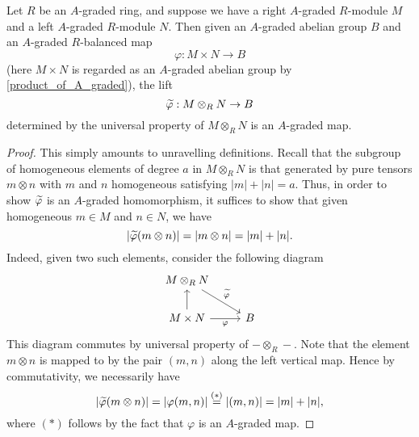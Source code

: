 \documentclass[../main.tex]{subfiles}
\begin{document}
\begin{lemma}\label{tensor_lift_of_A_graded_is_A_graded}
	Let $R$ be an $A$-graded ring, and suppose we have a right $A$-graded $R$-module $M$ and a left $A$-graded $R$-module $N$. Then given an $A$-graded abelian group $B$ and an $A$-graded $R$-balanced map
	\[\varphi:M\times N\to B\]
	(here $M\times N$ is regarded as an $A$-graded abelian group by \autoref{product_of_A_graded}), the lift
	\[\widetilde\varphi:M\otimes_RN\to B\]
	determined by the universal property of $M\otimes_RN$ is an $A$-graded map.
\end{lemma}
\begin{proof}
	This simply amounts to unravelling definitions. Recall that the subgroup of homogeneous elements of degree $a$ in $M\otimes_RN$ is that generated by pure tensors $m\otimes n$ with $m$ and $n$ homogeneous satisfying $|m|+|n|=a$. Thus, in order to show $\widetilde\varphi$ is an $A$-graded homomorphism, it suffices to show that given homogeneous $m\in M$ and $n\in N$, we have
	\[|\widetilde\varphi(m\otimes n)|=|m\otimes n|=|m|+|n|.\]
	Indeed, given two such elements, consider the following diagram
	\[\begin{tikzcd}
		{M\otimes_RN} \\
		{M\times N} & B
		\arrow[from=2-1, to=1-1]
		\arrow["\wt\varphi", from=1-1, to=2-2]
		\arrow["\varphi"', from=2-1, to=2-2]
	\end{tikzcd}\]
	This diagram commutes by universal property of $-\otimes_R-$. Note that the element $m\otimes n$ is mapped to by the pair $(m,n)$ along the left vertical map. Hence by commutativity, we necessarily have
	\[|\widetilde\varphi(m\otimes n)|=|\varphi(m,n)|\overset{(*)}=|(m,n)|=|m|+|n|,\]
	where $(*)$ follows by the fact that $\varphi$ is an $A$-graded map.
\end{proof}
\end{document}
